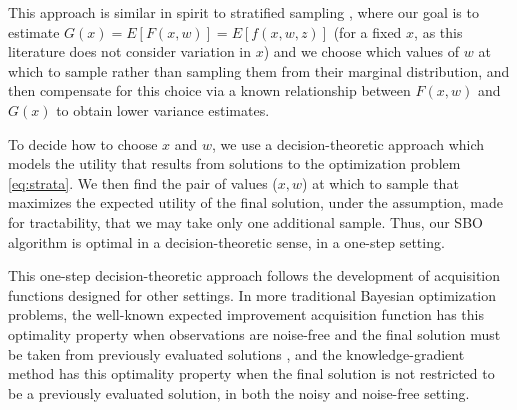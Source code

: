 \documentclass{article}
\newcommand{\w}{w}
\newcommand{\z}{z}
\begin{document}
This approach is similar in spirit to stratified sampling \cite{glasserman2003monte}, where our goal is to estimate $G(x) = E[F(x,\w)]=E[f(x,\w,\z)]$ (for a fixed $x$, as this literature does not consider variation in $x$) and we choose which values of $\w$ at which to sample rather than sampling them from their marginal distribution, and then compensate for this choice via a known relationship between $F(x,\w)$ and $G(x)$ to obtain lower variance estimates.



To decide how to choose $x$ and $\w$, we use a decision-theoretic approach which models the utility that results from solutions to the optimization problem \eqref{eq:strata}.  We then find the pair of values ($x,\w$) at which to sample that maximizes the expected utility of the final solution, under the assumption, made for tractability, that we may take only one additional sample.  Thus, our SBO algorithm is optimal in a decision-theoretic sense, in a one-step setting.

This one-step decision-theoretic approach follows the development of acquisition functions designed for other settings.  In more traditional Bayesian optimization problems, the well-known expected improvement acquisition function \cite{Mockus:1989,jones1998efficient} has this optimality property when observations are noise-free and the final solution must be taken from previously evaluated solutions \cite{Frazier:bayesianOpt}, and the knowledge-gradient method \cite{frazier2009knowledge,scott2011correlated} has this optimality property when the final solution is not restricted to be a previously evaluated solution, in both the noisy and noise-free setting.
\end{document}
